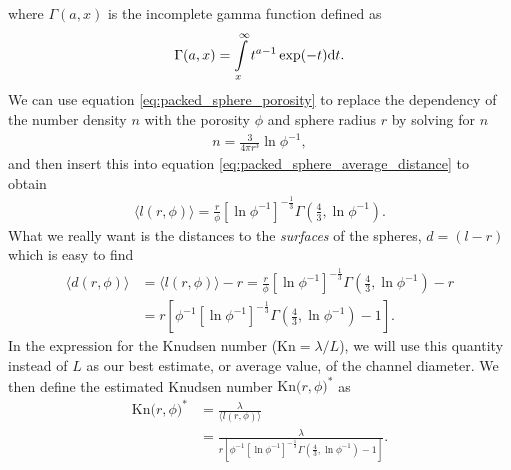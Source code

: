 where $\Gamma(a,x)$ is the incomplete gamma function defined as
\begin{align}
	\Gamma(a,x) = \int\limits_x^\infty t^{a-1}\exp(-t)\mathrm{d}t.
\end{align}
We can use equation \eqref{eq:packed_sphere_porosity} to replace the dependency of the number density $n$ with the porosity $\phi$ and sphere radius $r$ by solving for $n$ 
\begin{align}
	n = \frac{3}{4\pi r^3} \ln\phi^{-1},
\end{align}
and then insert this into equation \eqref{eq:packed_sphere_average_distance} to obtain
\begin{align}
	\langle l(r,\phi) \rangle = \frac{r}{\phi}\left[\ln\phi^{-1}\right]^{-\frac{1}{3}}\Gamma\left(\frac{4}{3},\ln\phi^{-1}\right).
\end{align}
What we really want is the distances to the \textit{surfaces} of the spheres, $d=(l-r)$ which is easy to find
\begin{align}
	\langle d(r,\phi)\rangle &= \langle l(r,\phi)\rangle - r = \frac{r}{\phi}\left[\ln\phi^{-1}\right]^{-\frac{1}{3}}\Gamma\left(\frac{4}{3},\ln\phi^{-1}\right) - r\\
	&= r\left[\phi^{-1}\left[\ln\phi^{-1}\right]^{-\frac{1}{3}}\Gamma\left(\frac{4}{3},\ln\phi^{-1}\right) - 1\right].
\end{align}
In the expression for the Knudsen number ($\text{Kn}=\lambda/L$), we will use this quantity instead of $L$ as our best estimate, or average value, of the channel diameter. We then define the estimated Knudsen number $\text{Kn($r,\phi$)}^*$ as
\begin{align}
	\text{Kn($r,\phi$)}^* &= \frac{\lambda}{\langle l(r,\phi)\rangle}\\
	\label{eq:packed_sphere_estimated_knudsen}
	&= \frac{\lambda}{r\left[\phi^{-1}\left[\ln\phi^{-1}\right]^{-\frac{1}{3}}\Gamma\left(\frac{4}{3},\ln\phi^{-1}\right) - 1\right]}.
\end{align}